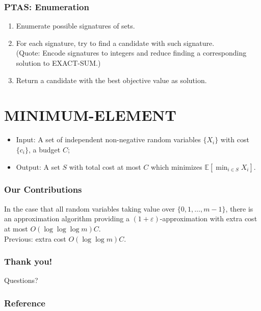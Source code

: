 \documentclass{beamer}
\newcommand{\Exp}{{\mathbb{E}}}
\newcommand{\mm}{{\textsf{MINIMUM-ELEMENT}}}
\newcommand{\ES}{{\textsf{EXACT-SUM}}}
\begin{document}
\begin{frame}
    \frametitle{PTAS: Enumeration}
    \begin{enumerate}
        \item Enumerate possible signatures of sets.
        \item For each signature, try to find a candidate with such signature.\\
            (Quote: Encode signatures to integers and reduce finding a corresponding solution to \ES.)
        \item Return a candidate with the best objective value as solution.
    \end{enumerate}
\end{frame}

\section{MINIMUM-ELEMENT}
\begin{frame}
    \begin{problem}[\mm]
        \begin{itemize}
            \item Input: A set of independent non-negative random variables $\{X_i\}$ with cost $\{c_i\}$, a budget $C$;
            \item Output: A set $S$ with total cost at most $C$ which minimizes $\Exp[\min_{i\in S} X_i]$.
        \end{itemize}
    \end{problem}
\end{frame}
\begin{frame}
\frametitle{Our Contributions}
\begin{theorem}
    In the case that all random variables taking value over $\{0, 1, \ldots, m - 1\}$, there is an approximation algorithm providing a $(1+\varepsilon)$-approximation with extra cost at most $O(\log\log\log m)C$.\\
    {\color{blue} Previous: extra cost $O(\log\log m)C$.}
\end{theorem}
\end{frame}

\begin{frame}\frametitle{Thank you!}
Questions?
\end{frame}

\begin{frame}\frametitle{Reference}


\end{frame}
\end{document}
